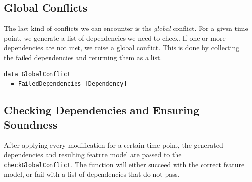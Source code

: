 \documentclass[a4paper,english]{ifimaster}
\begin{document}
\subsection{Global Conflicts}%
\label{sub:global_conflicts}

The last kind of conflicts we can encounter is the \textit{global} conflict. For a given time point, we generate a list of dependencies we need to check. If one or more dependencies are not met, we raise a global conflict. This is done by collecting the failed dependencies and returning them as a list.

\begin{verbatim}
data GlobalConflict
  = FailedDependencies [Dependency]
\end{verbatim}

\subsection{Checking Dependencies and Ensuring Soundness}%
\label{sub:checking_dependencies_and_ensuring_soundness}

After applying every modification for a certain time point, the generated dependencies and resulting feature model are passed to the \texttt{check\-Global\-Conflict}. The function will either succeed with the correct feature model, or fail with a list of dependencies that do not pass.
\end{document}
